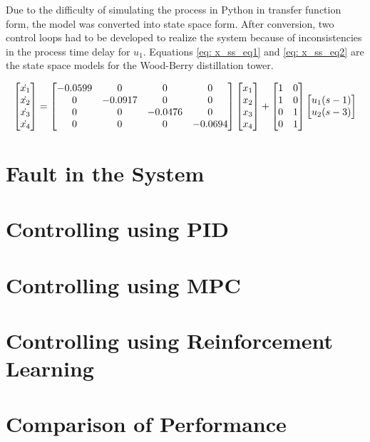 Due to the difficulty of simulating the process in Python in transfer function form, the model was converted into state space form.  After conversion, two control loops had to be developed to realize the system because of inconsistencies in the process time delay for $u_1$.  Equations \ref{eq: x_ss_eq1} and \ref{eq: x_ss_eq2} are the state space models for the Wood-Berry distillation tower.

\begin{equation}
    \centering
    \begin{bmatrix}
        \dot{x_1} \\
        \dot{x_2} \\
        \dot{x_3} \\
        \dot{x_4} 
    \end{bmatrix}
    =
    \begin{bmatrix}
        -0.0599     &     0     &     0     &     0 \\
        0           &  -0.0917  &     0     &     0 \\
        0           &     0     &   -0.0476 &     0 \\
        0           &     0     &     0     &  -0.0694
    \end{bmatrix}
    \begin{bmatrix}
        x_1 \\
        x_2 \\
        x_3 \\
        x_4 
    \end{bmatrix}
    +
    \begin{bmatrix}
        1     &     0  \\
        1     &     0  \\
        0     &     1  \\
        0     &     1
    \end{bmatrix}
    \begin{bmatrix}
        u_1(s - 1) \\
        u_2(s - 3)
    \end{bmatrix}
    \label{eq: x_ss_eq1}
\end{equation}

\section{Fault in the System}

\section{Controlling using PID}
\section{Controlling using MPC}
\section{Controlling using Reinforcement Learning}
\section{Comparison of Performance}
